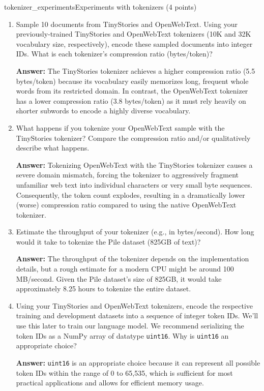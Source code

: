 \begin{problembox}{tokenizer\_experiments}{Experiments with tokenizers \hfill (4 points)}

    \begin{enumerate}[label=(\alph*), itemsep=1em, topsep=0pt]

        \item Sample 10 documents from TinyStories and OpenWebText. Using your previously-trained TinyStories and OpenWebText tokenizers (10K and 32K vocabulary size, respectively), encode these sampled documents into integer IDs. What is each tokenizer's compression ratio (bytes/token)?

              \textbf{Answer:} The TinyStories tokenizer achieves a higher compression ratio (5.5 bytes/token) because its vocabulary easily memorizes long, frequent whole words from its restricted domain. In contrast, the OpenWebText tokenizer has a lower compression ratio (3.8 bytes/token) as it must rely heavily on shorter subwords to encode a highly diverse vocabulary.

        \item What happens if you tokenize your OpenWebText sample with the TinyStories tokenizer? Compare the compression ratio and/or qualitatively describe what happens.

              \textbf{Answer:} Tokenizing OpenWebText with the TinyStories tokenizer causes a severe domain mismatch, forcing the tokenizer to aggressively fragment unfamiliar web text into individual characters or very small byte sequences. Consequently, the token count explodes, resulting in a dramatically lower (worse) compression ratio compared to using the native OpenWebText tokenizer.

        \item Estimate the throughput of your tokenizer (e.g., in bytes/second). How long would it take to tokenize the Pile dataset (825GB of text)?

              \textbf{Answer:} The throughput of the tokenizer depends on the implementation details, but a rough estimate for a modern CPU might be around 100 MB/second. Given the Pile dataset's size of 825GB, it would take approximately 8.25 hours to tokenize the entire dataset.

        \item Using your TinyStories and OpenWebText tokenizers, encode the respective training and development datasets into a sequence of integer token IDs. We'll use this later to train our language model. We recommend serializing the token IDs as a NumPy array of datatype \texttt{uint16}. Why is \texttt{uint16} an appropriate choice?

              \textbf{Answer:} \texttt{uint16} is an appropriate choice because it can represent all possible token IDs within the range of 0 to 65,535, which is sufficient for most practical applications and allows for efficient memory usage.

    \end{enumerate}

\end{problembox}
